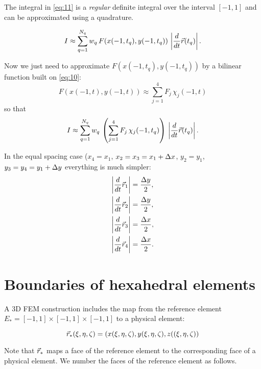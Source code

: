 \documentclass[11pt]{article}
\begin{document}
The integral in \eqref{eq:11} is a \emph{regular} definite integral over
the interval $[-1, 1]$ and can be approximated using a quadrature.

\begin{equation}
\label{eq:13}
I \approx \sum_{q=1}^{N_{q}} w_{q}\, F(x(-1, t_{q}), y(-1, t_{q}))\, \left|\frac{d}{dt}\vec r(t_{q}) \right|.
\end{equation}

Now we just need to approximate $F(x(-1, t_{q}), y(-1, t_{q}))$ by
a bilinear function built on \eqref{eq:10}:
\begin{equation}
\label{eq:14}
F(x(-1, t), y(-1, t)) \approx \sum_{j=1}^{4} F_{j}\, \chi_{j}(-1, t)
\end{equation}
so that
\begin{equation}
\label{eq:15}
I \approx \sum_{q=1}^{N_{q}} w_{q}\,
\left( \sum_{j=1}^{4} F_{j}\, \chi_{j}(-1, t_{q}) \right) \,
\left| \frac{d}{dt}\vec r(t_{q}) \right|.
\end{equation}

In the equal spacing case ($x_{4} = x_{1}$, $x_{2} = x_{3} = x_{1} +
\Delta x$, $y_{2} = y_{1}$, $y_{3} = y_{4} = y_{1} + \Delta y$ everything is much simpler:
\begin{align*}
\left| \frac{d}{dt}\vec r_{1}\right|  & = \frac{\Delta y}{2}, \\
\left| \frac{d}{dt}\vec r_{2}\right|  & = \frac{\Delta y}{2}, \\
\left| \frac{d}{dt}\vec r_{3}\right|  & = \frac{\Delta x}{2}, \\
\left| \frac{d}{dt}\vec r_{4}\right|  & = \frac{\Delta x}{2}. \\
\end{align*}

\section{Boundaries of hexahedral elements}
\label{sec-4}

A 3D FEM construction includes the map from the reference element
$E_{*} = [-1, 1] \times [-1,1] \times [-1,1]$ to a physical element:

\begin{equation}
\label{eq:16}
\vec r_{*}(\xi,\eta,\zeta) = \left( x(\xi,\eta,\zeta), y(\xi,\eta,\zeta), z((\xi,\eta,\zeta) \right)
\end{equation}

Note that $\vec r_{*}$ maps a face of the reference element to the
corresponding face of a physical element. We number the faces of the
reference element as follows.
\end{document}
